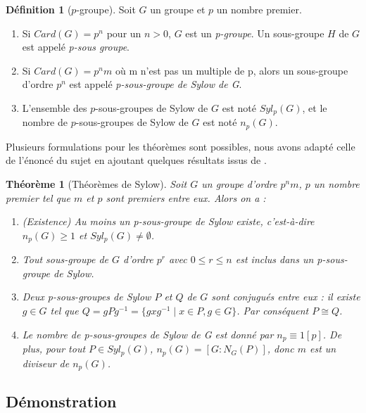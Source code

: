 \documentclass{article}
\theoremstyle{definition}
\newtheorem{definition}[subsubsection]{Définition}
\theoremstyle{plain}
\newtheorem{theorem}[subsubsection]{Théorème}
\theoremstyle{plain}
\theoremstyle{plain}
\theoremstyle{plain}
\theoremstyle{definition}
\theoremstyle{plain}
\theoremstyle{plain}
\begin{document}
\begin{definition}[\ensuremath{p}-groupe]
	Soit \( G \) un groupe et \( p \) un nombre premier.
	\begin{enumerate}[label = (\roman*)]
	\item Si \( Card(G) = p^{n} \) pour un \( n > 0 \), \( G \) est un \textit{p-groupe}. Un sous-groupe \( H \) de \( G \) est appelé \textit{p-sous groupe}.
	\item Si \( Card(G) = p^{n}m \) où m n'est pas un multiple de p, alors un sous-groupe d'ordre \( p^{n} \) est appelé \textit{p-sous-groupe de Sylow de G}.
	\item L'ensemble des \(p\)-sous-groupes de Sylow de \( G \) est noté \( Syl_{p}(G) \), et le nombre de \(p\)-sous-groupes de Sylow de \( G \) est noté \( n_{p}(G) \).
	\end{enumerate}
\end{definition}

Plusieurs formulations pour les théorèmes sont possibles, nous avons adapté celle de l'énoncé du sujet en ajoutant quelques résultats issus de \cite[p.~215]{chen2024napkin}.

\begin{theorem}[Théorèmes de Sylow]\label{theorem:S}
	Soit \( G \) un groupe d'ordre \( p^{n}m \), \( p \) un nombre premier tel que \( m \) et \( p \) sont premiers entre eux. Alors on a :
	\begin{enumerate}[label={\upshape(\roman*)}]
		\item (Existence) Au moins un p-sous-groupe de Sylow existe, c'est-à-dire \( n_{p}(G) \geq 1 \) et \( Syl_{p}(G) \neq \emptyset \).\label{S1}
		\item Tout sous-groupe de \( G \) d'ordre \( p^{r} \) avec \( 0 \leq r \leq n \) est inclus dans un p-sous-groupe de Sylow. \label{S2}
		\item Deux p-sous-groupes de Sylow \( P \) et \( Q \) de \( G \) sont conjugués entre eux : il existe \( g \in G \) tel que \( Q = gPg^{-1} = \{ gxg^{-1} \mid x \in P, g \in G \} \). Par conséquent \( P \cong Q \).\label{S3}
		\item Le nombre de p-sous-groupes de Sylow de G est donné par \( n_{p} \equiv 1 [p] \). De plus, pour tout \( P \in Syl_{p}({G}) \), \( n_{p}({G}) = [G : N_{G}({P}) ] \), donc \( m \) est un diviseur de \( n_p({G}) \).\label{S4}
	\end{enumerate}

\end{theorem}

\subsection{Démonstration}
\end{document}
